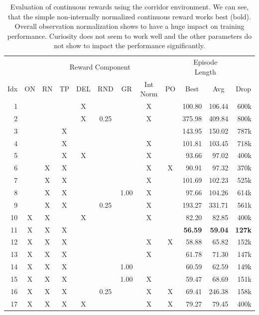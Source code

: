 \begin{table}[ht!]
    \begin{center}
        \begin{tabular}{rccccccccrrr}
            \toprule
             & \multicolumn{8}{c}{Reward Component} & \multicolumn{2}{c}{Episode Length} & \\
            \cmidrule(lr){2-9}\cmidrule(lr){10-11}
            \multicolumn{1}{c}{Idx} & \multicolumn{1}{c}{ON} & \multicolumn{1}{c}{RN} & \multicolumn{1}{c}{TP} & \multicolumn{1}{c}{DEL} & \multicolumn{1}{c}{RND} & \multicolumn{1}{c}{GR} & \multicolumn{1}{c}{Int Norm} & \multicolumn{1}{c}{PO} & \multicolumn{1}{c}{Best} & \multicolumn{1}{c}{Avg} & \multicolumn{1}{c}{Drop}\\
            \midrule
            1 &  &  &  & X &  &  & X &  & 100.80 & 106.44 & 600k \\
            2 &  &  &  & X & 0.25 &  & X &  & 375.98 & 409.84 & 800k \\
            3 &  &  & X &  &  &  &  &  & 143.95 & 150.02 & 787k \\
            4 &  &  & X &  &  &  & X &  & 101.81 & 103.45 & 718k \\
            5 &  &  & X & X &  &  & X &  & 93.66 & 97.02 & 400k \\
            6 &  & X & X &  &  &  & X & X & 90.91 & 97.32 & 370k \\
            7 &  & X & X &  &  &  & X &  & 101.69 & 102.23 & 525k \\
            8 &  & X & X &  &  & 1.00 & X &  & 97.66 & 104.26 & 614k \\
            9 &  & X & X &  & 0.25 &  & X &  & 193.27 & 331.71 & 561k \\
            10 & X & X &  & X &  &  & X &  & 82.20 & 82.85 & 400k \\
            11 & X & X & X &  &  &  &  &  & \textbf{56.59} & \textbf{59.04} & \textbf{127k} \\
            12 & X & X & X &  &  &  & X & X & 58.88 & 65.82 & 152k \\
            13 & X & X & X &  &  &  & X &  & 61.78 & 71.30 & 147k \\
            14 & X & X & X &  &  & 1.00 &  &  & 60.59 & 62.59 & 149k \\
            15 & X & X & X &  &  & 1.00 & X &  & 59.47 & 68.69 & 151k \\
            16 & X & X & X &  & 0.25 &  & X & X & 69.41 & 246.38 & 158k \\
            17 & X & X & X & X &  &  & X & X & 79.27 & 79.45 & 400k \\
            \bottomrule
        \end{tabular}
    \end{center}
    \caption[Evaluation of Continuous Reward using the Corridor Environment]{Evaluation of continuous rewards using the corridor environment. We can see, that the simple non-internally normalized continuous reward works best (bold). Overall observation normalization shows to have a huge impact on training performance. Curiosity does not seem to work well and the other parameters do not show to impact the performance significantly.} \label{tab:Maze0318/Reward/Continuous}
\end{table}

